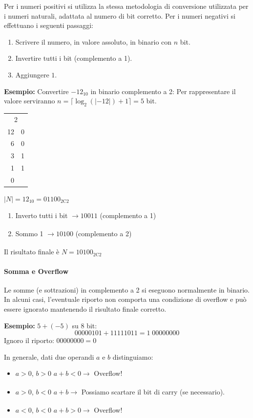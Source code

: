 \documentclass[oneside]{scrbook}
\begin{document}
Per i numeri positivi si utilizza la stessa metodologia di conversione utilizzata per i numeri naturali, adattata al numero di bit corretto. 
Per i numeri negativi si effettuano i seguenti passaggi:
\begin{enumerate}
  \item Scrivere il numero, in valore assoluto, in binario con $n$ bit.
  \item Invertire tutti i bit (complemento a 1).
  \item Aggiungere $1$.
\end{enumerate}

\textbf{Esempio:}  
Convertire $-12_{10}$ in binario complemento a 2:
Per rappresentare il valore serviranno $n = \lceil \log_2(|-12|) +1 \rceil = 5$ bit.
\begin{center}
\begin{tabular}{r|r}
    \multicolumn{2}{c}{2} \\
    12 & 0 \\
    6 & 0 \\
    3 & 1 \\
    1 & 1 \\
    0
\end{tabular}
\end{center}
$|N| = 12_{10} = 01100_{2\text{C2}}$
\begin{enumerate}
    \item Inverto tutti i bit  $\xrightarrow[]{}10011$ (complemento a 1)
    \item Sommo 1 $\xrightarrow[]{}10100$ (complemento a 2)
\end{enumerate}
Il risultato finale è $N = 10100_{2\text{C2}}$

\paragraph{Somma e Overflow}
Le somme (e sottrazioni) in complemento a 2 si eseguono normalmente in binario.  
In alcuni casi, l’eventuale riporto non comporta una condizione di overflow e può essere ignorato mantenendo il risultato finale corretto.  

\textbf{Esempio:}  
$5 + (-5)$ su 8 bit:  
\[
00000101 + 11111011 = 1\;00000000
\]
Ignoro il riporto: $00000000 = 0$ 

In generale, dati due operandi $a$ e $b$ distinguiamo:
\begin{itemize}
    \item $a>0$, $b>0$ $a+b< 0 \xrightarrow[]{}$ Overflow!
    \item $a>0$, $b<0$ $a+b \xrightarrow[]{}$ Possiamo scartare il bit di carry (se necessario).
    \item $a<0$, $b<0$ $a+b> 0 \xrightarrow[]{}$ Overflow! 
\end{itemize}
\end{document}
